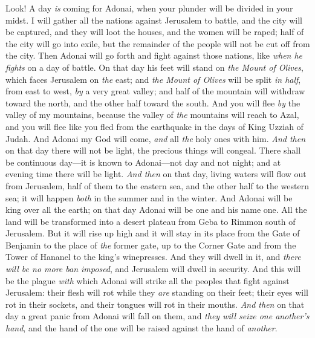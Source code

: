 \begin{biblechapter} %
 Look! A day \textit{is} coming for Adonai, when your plunder will be divided in your midst.
\verse I will gather all the nations against Jerusalem to battle, and the city will be captured, and they will loot the houses, and the women will be raped; half of the city will go into exile, but the remainder of the people will not be cut off from the city.
\verse Then Adonai will go forth and fight against those nations, like \textit{when he fights} on a day of battle.
\verse On that day his feet will stand on \textit{the Mount of Olives}, which faces Jerusalem on \textit{the} east; and \textit{the Mount of Olives} will be split \textit{in half}, from east to west, \textit{by} a very great valley; and half of the mountain will withdraw toward the north, and the other half toward the south.
\verse And you will flee \textit{by} the valley of my mountains, because the valley of \textit{the} mountains will reach to Azal, and you will flee like you fled from the earthquake in the days of King Uzziah of Judah. And Adonai my God will come, \textit{and} all \textit{the} holy ones with him.
\verse \textit{And then} on that day there will not be light, the precious things will congeal.
\verse There shall be continuous day—it is known to Adonai—not day and not night; and at evening time there will be light.
\verse \textit{And then} on that day, living waters will flow out from Jerusalem, half of them to the eastern sea, and the other half to the western sea; it will happen \textit{both} in the summer and in the winter.
\verse And Adonai will be king over all the earth; on that day Adonai will be one and his name one.
\verse All the land will be transformed into a desert plateau from Geba to Rimmon south of Jerusalem. But it will rise up high and it will stay in its place from the Gate of Benjamin to the place of \textit{the} former gate, up to the Corner Gate and from the Tower of Hananel to the king’s winepresses.
\verse And they will dwell in it, and \textit{there will be no more ban imposed}, and Jerusalem will dwell in security.
\verse And this will be the plague \textit{with} which Adonai will strike all the peoples that fight against Jerusalem: their flesh will rot while they \textit{are} standing on their feet; their eyes will rot in their sockets, and their tongues will rot in their mouths.
\verse \textit{And then} on that day a great panic from Adonai will fall on them, and \textit{they will seize one another’s hand}, and the hand of the one will be raised against the hand of \textit{another}.

\end{biblechapter}
